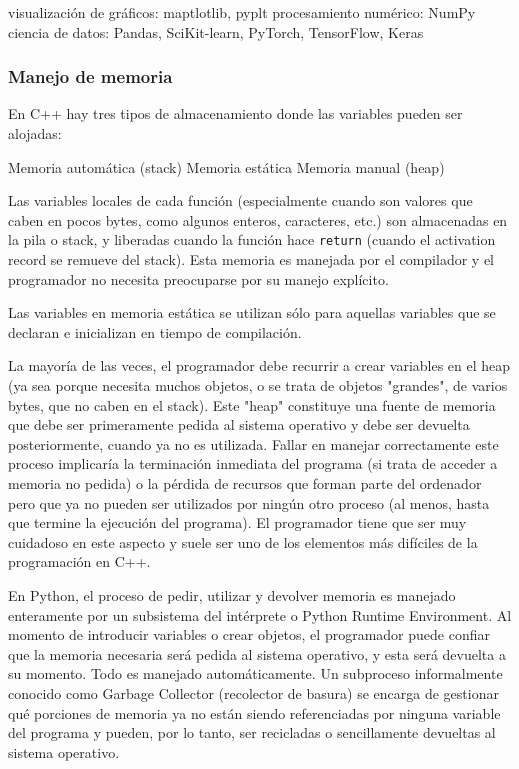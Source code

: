 \documentclass[]{article}
\begin{document}
visualización de gráficos: maptlotlib, pyplt
procesamiento numérico: NumPy
ciencia de datos: Pandas, SciKit-learn, PyTorch, TensorFlow, Keras

\subsubsection{Manejo de memoria}

En C++ hay tres tipos de almacenamiento donde las variables pueden ser
alojadas:



Memoria automática (stack)
Memoria estática
Memoria manual (heap)

Las variables locales de cada función (especialmente cuando son valores que
caben en pocos bytes, como algunos enteros, caracteres, etc.) son almacenadas
en la pila o stack, y liberadas cuando la función hace \verb!return! (cuando el
activation record se remueve del stack). Esta memoria es manejada por el
compilador y el programador no necesita preocuparse por su manejo explícito.

Las variables en memoria estática se utilizan sólo para aquellas variables que
se declaran e inicializan en tiempo de compilación.

La mayoría de las veces, el programador debe recurrir a crear variables en el
heap (ya sea porque necesita muchos objetos, o se trata de objetos "grandes",
de varios bytes, que no caben en el stack). Este "heap" constituye una fuente
de memoria que debe ser primeramente pedida al sistema operativo y debe ser
devuelta posteriormente, cuando ya no es utilizada. Fallar en manejar
correctamente este proceso implicaría la terminación inmediata del programa (si
trata de acceder a memoria no pedida) o la pérdida de recursos que forman parte
del ordenador pero que ya no pueden ser utilizados por ningún otro proceso (al
menos, hasta que termine la ejecución del programa). El programador tiene que
ser muy cuidadoso en este aspecto y suele ser uno de los elementos más
difíciles de la programación en C++.

En Python, el proceso de pedir, utilizar y devolver memoria es manejado
enteramente por un subsistema del intérprete o Python Runtime Environment. Al
momento de introducir variables o crear objetos, el programador puede confiar
que la memoria necesaria será pedida al sistema operativo, y esta será devuelta
a su momento. Todo es manejado automáticamente. Un subproceso informalmente
conocido como Garbage Collector (recolector de basura) se encarga de gestionar
qué porciones de memoria ya no están siendo referenciadas por ninguna variable
del programa y pueden, por lo tanto, ser recicladas o sencillamente devueltas
al sistema operativo.
\end{document}
